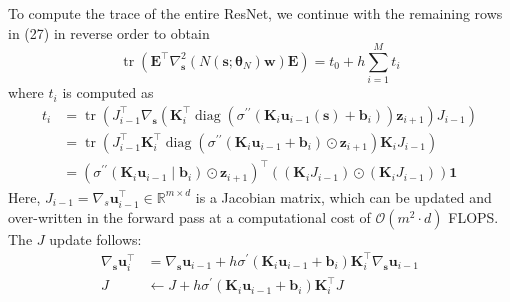 \documentclass{article}
\begin{document}
\begin{flushleft}
To compute the trace of the entire ResNet, we continue with the remaining rows in (27) in reverse order to obtain
$$
\operatorname{tr}\left(\boldsymbol{E}^{\top} \nabla_{\boldsymbol{s}}^{2}\left(N\left(\boldsymbol{s} ; \boldsymbol{\theta}_{N}\right) \boldsymbol{w}\right) \boldsymbol{E}\right)=t_{0}+h \sum_{i=1}^{M} t_{i}
$$
where $t_{i}$ is computed as
$$
\begin{aligned}
t_{i} &=\operatorname{tr}\left(J_{i-1}^{\top} \nabla_{\boldsymbol{s}}\left(\boldsymbol{K}_{i}^{\top} \operatorname{diag}\left(\sigma^{\prime \prime}\left(\boldsymbol{K}_{i} \boldsymbol{u}_{i-1}(\boldsymbol{s})+\boldsymbol{b}_{i}\right)\right) \boldsymbol{z}_{i+1}\right) J_{i-1}\right) \\
&=\operatorname{tr}\left(J_{i-1}^{\top} \boldsymbol{K}_{i}^{\top} \operatorname{diag}\left(\sigma^{\prime \prime}\left(\boldsymbol{K}_{i} \boldsymbol{u}_{i-1}+\boldsymbol{b}_{i}\right) \odot \boldsymbol{z}_{i+1}\right) \boldsymbol{K}_{i} J_{i-1}\right) \\
&=\left(\sigma^{\prime \prime}\left(\boldsymbol{K}_{i} \boldsymbol{u}_{i-1} \mid \boldsymbol{b}_{i}\right) \odot \boldsymbol{z}_{i+1}\right)^{\top}\left(\left(\boldsymbol{K}_{i} J_{i-1}\right) \odot\left(\boldsymbol{K}_{i} J_{i-1}\right)\right) \mathbf{1}
\end{aligned}
$$
Here, $J_{i-1}=\nabla_{s} \boldsymbol{u}_{i-1}^{\top} \in \mathbb{R}^{m \times d}$ is a Jacobian matrix, which can be updated and over-written in the forward pass at a computational cost of $\mathcal{O}\left(m^{2} \cdot d\right)$ FLOPS. The $J$ update follows:
$$
\begin{aligned}
\nabla_{\boldsymbol{s}} \boldsymbol{u}_{i}^{\top} &=\nabla_{\boldsymbol{s}} \boldsymbol{u}_{i-1}+h \sigma^{\prime}\left(\boldsymbol{K}_{i} \boldsymbol{u}_{i-1}+\boldsymbol{b}_{i}\right) \boldsymbol{K}_{i}^{\top} \nabla_{\boldsymbol{s}} \boldsymbol{u}_{i-1} \\
J & \leftarrow J+h \sigma^{\prime}\left(\boldsymbol{K}_{i} \boldsymbol{u}_{i-1}+\boldsymbol{b}_{i}\right) \boldsymbol{K}_{i}^{\top} J
\end{aligned}
$$
\end{flushleft}
\end{document}
